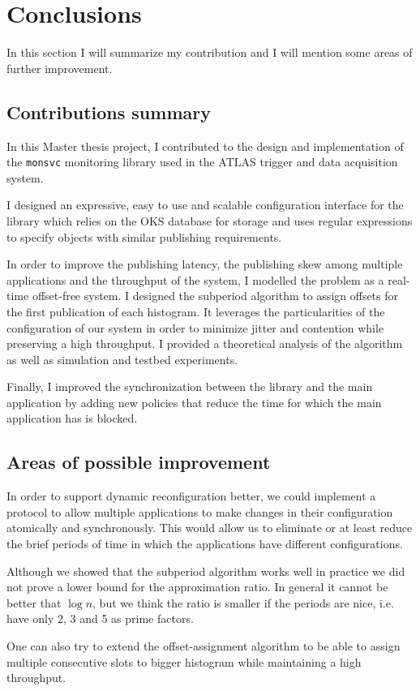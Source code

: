 \chapter{Conclusions} %
\label{Capitolul6}


In this section I will summarize my contribution and I will mention some areas of further improvement.

\section{Contributions summary}

In this Master thesis project, I contributed to the design and implementation of the {\tt monsvc} monitoring library used in the ATLAS trigger and data acquisition system.

I designed an expressive, easy to use and scalable configuration interface for the library which relies on the OKS \citep{jones1998oks} database for storage and uses regular expressions to specify objects with similar publishing requirements.

In order to improve the publishing latency, the publishing skew among multiple applications and the throughput of the system, I modelled the problem as a real-time offset-free system. I designed the subperiod algorithm to assign offsets for the first publication of each histogram. It leverages the particularities of the configuration of our system in order to minimize jitter and contention while preserving a high throughput. I provided a theoretical analysis of the algorithm as well as simulation and testbed experiments.

Finally, I improved the synchronization between the library and the main application by adding new policies that reduce the time for which the main application has is blocked.


\section{Areas of possible improvement}

In order to support dynamic reconfiguration better, we could implement a protocol to allow multiple applications to make changes in their configuration atomically and synchronously. This would allow us to eliminate or at least reduce the brief periods of time in which the applications have different configurations.

Although we showed that the subperiod algorithm works well in practice we did not prove a lower bound for the approximation ratio. In general it cannot be better that $\log n$, but we think the ratio is smaller if the periods are nice, i.e. have only 2, 3 and 5 as prime factors.

One can also try to extend the offset-assignment algorithm to be able to assign multiple consecutive slots to bigger histogram while maintaining a high throughput. 
